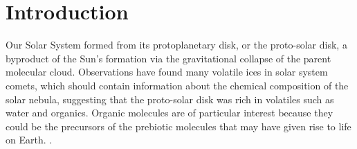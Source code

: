 \documentclass[linenumbers, twocolumn, twocolappendix, astrosymb, times]{aastex631}
\begin{document}

\section{Introduction} \label{sec:intro}
Our Solar System formed from its protoplanetary disk, or the proto-solar disk, a byproduct of the Sun's formation via the gravitational collapse of the parent molecular cloud. Observations have found many volatile ices in solar system comets, which should contain information about the chemical composition of the solar nebula, suggesting that the proto-solar disk was rich in volatiles such as water and organics. Organic molecules are of particular interest because they could be the precursors of the prebiotic molecules that may have given rise to life on Earth. \citep{Ceccarelli2023}.
\end{document}
